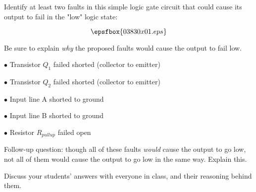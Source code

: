 

Identify at least two faults in this simple logic gate circuit that could cause its output to fail in the "low" logic state:

$$\epsfbox{03830x01.eps}$$

Be sure to explain {\it why} the proposed faults would cause the output to fail low.







\medskip
\item{$\bullet$} Transistor $Q_1$ failed shorted (collector to emitter)
\item{$\bullet$} Transistor $Q_2$ failed shorted (collector to emitter)
\item{$\bullet$} Input line A shorted to ground
\item{$\bullet$} Input line B shorted to ground
\item{$\bullet$} Resistor $R_{pullup}$ failed open
\medskip

\vskip 10pt

Follow-up question: though all of these faults {\it would} cause the output to go low, not all of them would cause the output to go low in the same way.  Explain this.







Discuss your students' answers with everyone in class, and their reasoning behind them.




